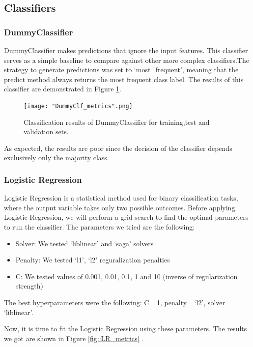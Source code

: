 \documentclass[10pt, a4paper]{article}
\begin{document}
	
	\subsection{Classifiers}
	\subsubsection{DummyClassifier}
	DummyClassifier makes predictions that ignore the input features. This classifier serves as a simple baseline to compare against other more complex classifiers.The strategy to generate predictions was set to ‘most\_frequent’,  meaning that the predict method always returns the most frequent class label. The results of this classifier are demonstrated in Figure \ref{fig::dummy_metrics}.
	
	\begin{figure}
		\centering
		\texttt{[image: "DummyClf\_metrics".png]}
		\caption{Classification results of DummyClassifier for training,test and validation sets.}
		\label{fig::dummy_metrics}
	\end{figure}
	
	
	As expected, the results are poor since the decision of the classifier depends exclusively only the majority class.
	
	\subsubsection{Logistic Regression}
	Logistic Regression is a statistical method used for binary classification tasks, where the output variable takes only two possible outcomes.
	Before applying Logistic Regression, we will perform a grid search to find the optimal parameters to run the classifier. The parameters we tried are the following:
	\begin{itemize}
		\item{Solver: We tested ‘liblinear’ and ‘saga’ solvers}
		\item{Penalty: We tested ‘l1’, ‘l2’ reguralization penalties}
		\item{C: We tested values of 0.001, 0.01, 0.1, 1 and 10 (inverse of regularization strength)}
	\end{itemize}
	
	The best hyperparameters were the following:
	C= 1, penalty= ‘l2’, solver = ‘liblinear’.
	
	Now, it is time to fit the Logistic Regression using these parameters. The results we got are shown in Figure \ref{fig::LR_metrics} .
	
\end{document}
